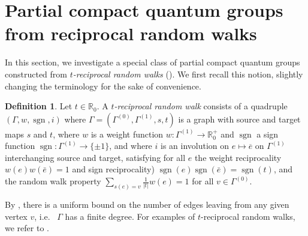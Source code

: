 \documentclass[10pt]{article}
\DeclareMathOperator{\sgn}{\mathrm{sgn}}
\newcommand{\C}{\mathbb{C}}
\newcommand{\R}{\mathbb{R}}
\newcommand{\Rep}{\mathrm{Rep}}
\theoremstyle{definition}
\newtheorem{Def}[Theorem]{Definition}
\numberwithin{equation}{section}
\begin{document}
\section{Partial compact quantum groups from reciprocal random walks}\label{SecDyn}

In this section, we investigate a special class of partial compact quantum groups constructed from \emph{$t$-reciprocal random walks} (\cite{DCY1}). We first recall this notion, slightly changing the terminology for the sake of convenience.

\begin{Def} Let $t\in \R_0$. A \emph{$t$-reciprocal random walk} consists of a quadruple $(\Gamma,w,\sgn,i)$ where $\Gamma=(\Gamma^{(0)},\Gamma^{(1)},s,t)$ is a graph with source and target maps $s$ and $t$, where $w$ is a weight function $w:\Gamma^{(1)}\rightarrow \R_0^+$ and $\sgn$ a sign function $\sgn:\Gamma^{(1)}\rightarrow \{\pm 1\}$, and where $i$ is an involution on $e\mapsto \overline{e}$ on $\Gamma^{(1)}$ interchanging source and target,  satisfying for all $e$ the weight reciprocality $w(e)w(\bar{e}) = 1$ and sign reciprocality) $\sgn(e)\sgn(\bar{e}) = \sgn(t)$, and the random walk property $\sum_{s(e)=v}  \frac{1}{|t|}w(e) = 1$ for all $v\in \Gamma^{(0)}$.
\end{Def}


By \cite[Proposition 3.1]{DCY1}, there is a uniform bound on the number of edges leaving from any given vertex $v$, i.e.~ $\Gamma$ has a finite degree. For examples of $t$-reciprocal random walks, we refer to \cite{DCY1}. 

\end{document}
